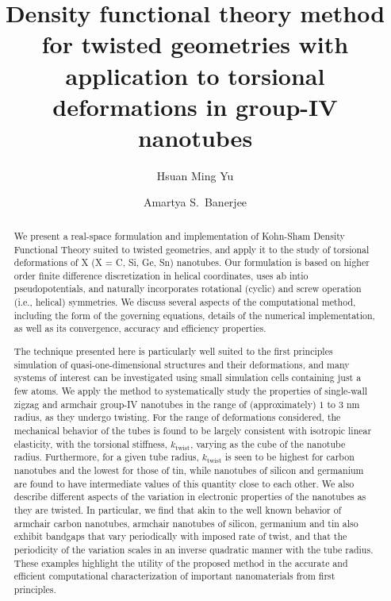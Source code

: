 \documentclass[preprint,12pt, 3p, sort&compress]{elsarticle}
\begin{document}

\begin{frontmatter}
\title{Density functional theory method for twisted geometries with application to torsional deformations in group-IV nanotubes}

\author[uclamse]{Hsuan Ming Yu}
\author[uclamse]{Amartya S.\ Banerjee}
\address[uclamse]{Department of Materials Science and Engineering, University of California, Los Angeles, CA 90095, U.S.A}
\begin{abstract}
We present a real-space formulation and implementation of Kohn-Sham Density Functional Theory suited to twisted geometries, and apply it to the study of torsional deformations of X (X = C, Si, Ge, Sn) nanotubes.  Our formulation is based on higher order finite difference discretization in helical coordinates, uses ab intio pseudopotentials, and naturally incorporates rotational (cyclic) and screw operation (i.e., helical) symmetries. We discuss several aspects of the computational method, including the form of the governing equations, details of the numerical implementation, as well as its convergence, accuracy and efficiency properties. 

The technique presented here is particularly well suited to the first principles simulation of quasi-one-dimensional structures and their deformations, and many systems  of interest can be investigated using small simulation cells containing just a few atoms. We apply the method to systematically study the properties of single-wall zigzag and armchair group-IV nanotubes in the range of (approximately) $1$ to $3$ nm radius, as they undergo twisting. For the range of deformations considered, the mechanical behavior of the tubes is found to be largely consistent with isotropic linear elasticity, with the torsional stiffness, $k_{\text{twist}}$, varying as the cube of the nanotube radius. Furthermore, for a given tube radius, $k_{\text{twist}}$ is seen to be highest for carbon nanotubes and the lowest for those of tin, while nanotubes of silicon and germanium are found to have intermediate values of this quantity close to each other. We also describe different aspects of the variation in electronic properties of the nanotubes as they are twisted. In particular, we find that akin to the well known behavior of armchair carbon nanotubes, armchair nanotubes of silicon, germanium and tin also exhibit bandgaps that vary periodically with imposed rate of twist, and that the periodicity of the variation scales in an inverse quadratic manner with the tube radius. These examples highlight the utility of the proposed method in the accurate and efficient computational characterization of important nanomaterials from first principles.
\end{abstract}
 

\end{frontmatter}
\end{document}
